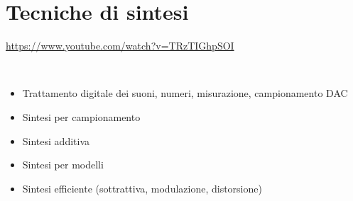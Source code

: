 
\section{Tecniche di sintesi}

\url{https://www.youtube.com/watch?v=TRzTIGhpSOI}

~\vfill

\begin{itemize}
\item Trattamento digitale dei suoni, numeri, misurazione, campionamento DAC
\item Sintesi per campionamento
\item Sintesi additiva
\item Sintesi per modelli
\item Sintesi efficiente (sottrattiva, modulazione, distorsione)
\end{itemize}

\clearpage

